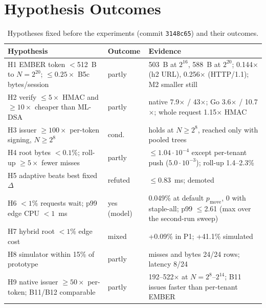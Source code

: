 \section{Hypothesis Outcomes}
\label{app:hyp}

\begin{table}[!h]
\centering
\caption{Hypotheses fixed before the experiments (commit \texttt{3148c65}) and their outcomes.}
\label{tab:hyp}
\footnotesize
\setlength{\tabcolsep}{2.5pt}
\begin{tabular}{@{}p{3.3cm}p{1.0cm}p{3.6cm}@{}}
\toprule
Hypothesis & Outcome & Evidence \\
\midrule
H1 EMBER token $<$512~B to $N{=}2^{20}$; $\le0.25\times$ B5c bytes/session & partly & 503~B at $2^{16}$, 588~B at $2^{20}$; 0.144$\times$ (h2 URL), 0.256$\times$ (HTTP/1.1); M2 smaller still \\
H2 verify $\le5\times$ HMAC and $\ge10\times$ cheaper than ML-DSA & partly & native 7.9$\times$ / 43$\times$; Go 3.6$\times$ / 10.7$\times$; whole request 1.15$\times$ HMAC \\
H3 issuer $\ge100\times$ per-token signing, $N\ge2^8$ & cond. & holds at $N\ge2^8$, reached only with pooled trees \\
H4 root bytes $<0.1\%$; roll-up $\ge5\times$ fewer misses & partly & $\le1.04\cdot10^{-4}$ except per-tenant push ($5.0\cdot10^{-3}$); roll-up 1.4--2.3\% \\
H5 adaptive beats best fixed $\Delta$ & refuted & $\le$0.83~ms; demoted \\
H6 $<1\%$ requests wait; p99 edge CPU $<1$~ms & yes (model) & 0.049\% at default $p_{\text{move}}$, 0 with staple-all; p99 $\le$2.61\us{} (max over the second-run sweep) \\
H7 hybrid root $<1\%$ edge cost & mixed & +0.09\% in P1; +41.1\% simulated \\
H8 simulator within 15\% of prototype & partly & misses and bytes 24/24 rows; latency 8/24 \\
H9 native issuer $\ge50\times$ per-token; B11/B12 comparable & partly & 192--522$\times$ at $N{=}2^8$--$2^{14}$; B11 issues faster than per-tenant EMBER \\
\bottomrule
\end{tabular}
\end{table}
